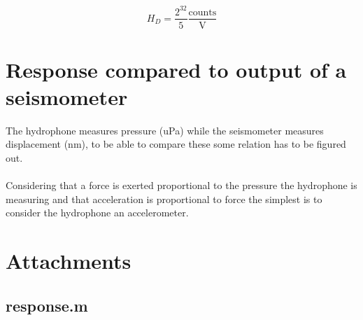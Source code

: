\documentclass[a4paper]{article}
\begin{document}
\begin{multicols}{2}
\begin{equation}
  H_{D} = \frac{2^{32}}{5} \frac{\text{counts}}{\text{V}}
  \label{eqn:digital_transfer}
\end{equation}

\section{Response compared to output of a seismometer}
The hydrophone measures pressure (uPa) while the seismometer measures
displacement (nm), to be able to compare these some relation has to be
figured out.

\paragraph{} Considering that a force is exerted proportional to the
pressure the hydrophone is measuring and that acceleration is
proportional to force the simplest is to consider the hydrophone an
accelerometer.

\vspace{5em}
\printbibliography
\end{multicols}

\newpage

\section{Attachments}
\subsection{response.m}

\end{document}
